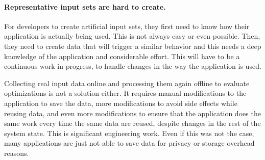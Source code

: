 
    \paragraph{Representative input sets are hard to create.} For developers to create artificial input sets, they first need to know how
    their application is actually being used. This is not always easy or even possible. Then, they need to create data that will trigger a
    similar behavior and this needs a deep knowledge of the application and considerable effort. This will have to be a continuous work in
    progress, to handle changes in the way the application is used.

    Collecting real input data online and processing them again offline to evaluate optimizations is not a solution either. It requires
    manual modifications to the application to save the data, more modifications to avoid side effects while reusing data, and even more
    modifications to ensure that the application does the same work every time the same data are reused, despite changes in the rest of
    the system state. This is significant engineering work. Even if this was not the case, many applications are just not able to save
    data for privacy or storage overhead reasons.

